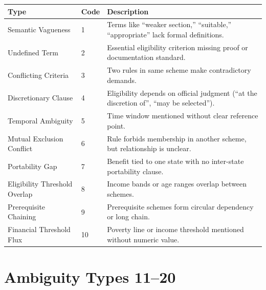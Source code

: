 \documentclass[11pt,a4paper]{report}
\begin{document}
\begin{center}
\small
\begin{tabularx}{\textwidth}{lp{1.2cm}p{6cm}}
\toprule
\textbf{Type} & \textbf{Code} & \textbf{Description} \\
\midrule
Semantic Vagueness & 1 & Terms like ``weaker section,'' ``suitable,'' ``appropriate'' lack formal definitions. \\
Undefined Term & 2 & Essential eligibility criterion missing proof or documentation standard. \\
Conflicting Criteria & 3 & Two rules in same scheme make contradictory demands. \\
Discretionary Clause & 4 & Eligibility depends on official judgment (``at the discretion of'', ``may be selected''). \\
Temporal Ambiguity & 5 & Time window mentioned without clear reference point. \\
Mutual Exclusion Conflict & 6 & Rule forbids membership in another scheme, but relationship is unclear. \\
Portability Gap & 7 & Benefit tied to one state with no inter-state portability clause. \\
Eligibility Threshold Overlap & 8 & Income bands or age ranges overlap between schemes. \\
Prerequisite Chaining & 9 & Prerequisite schemes form circular dependency or long chain. \\
Financial Threshold Flux & 10 & Poverty line or income threshold mentioned without numeric value. \\
\bottomrule
\end{tabularx}
\end{center}

\section{Ambiguity Types 11--20}
\end{document}
